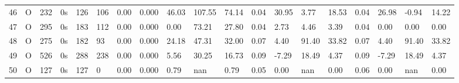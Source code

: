 \begin{tabular}{rllllllrlllllllllll}
46 & O & 232 & 0s & 126 & 106 & 0.00 & 0.000 & 46.03 & 107.55 & 74.14 & 0.04 & 30.95 & 3.77 & 18.53 & 0.04 & 26.98 & -0.94 & 14.22 \\
47 & O & 295 & 0s & 183 & 112 & 0.00 & 0.000 & 0.00 & 73.21 & 27.80 & 0.04 & 2.73 & 4.46 & 3.39 & 0.04 & 0.00 & 0.00 & 0.00 \\
48 & O & 275 & 0s & 182 & 93 & 0.00 & 0.000 & 24.18 & 47.31 & 32.00 & 0.07 & 4.40 & 91.40 & 33.82 & 0.07 & 4.40 & 91.40 & 33.82 \\
49 & O & 526 & 0s & 288 & 238 & 0.00 & 0.000 & 5.56 & 30.25 & 16.73 & 0.09 & -7.29 & 18.49 & 4.37 & 0.09 & -7.29 & 18.49 & 4.37 \\
50 & O & 127 & 0s & 127 & 0 & 0.00 & 0.000 & 0.79 & nan & 0.79 & 0.05 & 0.00 & nan & 0.00 & 0.06 & 0.00 & nan & 0.00 \\
\bottomrule
\end{tabular}
